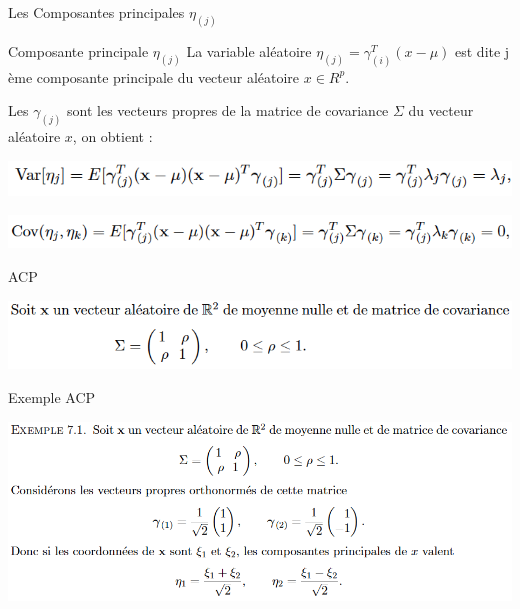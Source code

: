 \documentclass[11pt]{beamer}
\begin{document}
\begin{frame}{Les Composantes principales $\eta_{(j)}$ }

\begin{block}{Composante principale $\eta_{(j)}$}
La variable aléatoire $\eta_{(j)} = \gamma_{(i)}^T(x-\mu) $ est dite j ème composante principale du vecteur aléatoire $x \in R^p$.
\end{block}


Les $\gamma_{(j)}$ sont les vecteurs propres de la matrice
de covariance $\Sigma$  du vecteur aléatoire $x$, on obtient : 


\includegraphics[scale=0.5]{VarEtaj.png}


\includegraphics[scale=0.45]{CovEtaj.png}



\end{frame}


\begin{frame}{ ACP}

\includegraphics[scale=0.35]{ex1.png}

\end{frame}


\begin{frame}{Exemple ACP }

\includegraphics[scale=0.39]{ex.png}

\end{frame}
\end{document}
